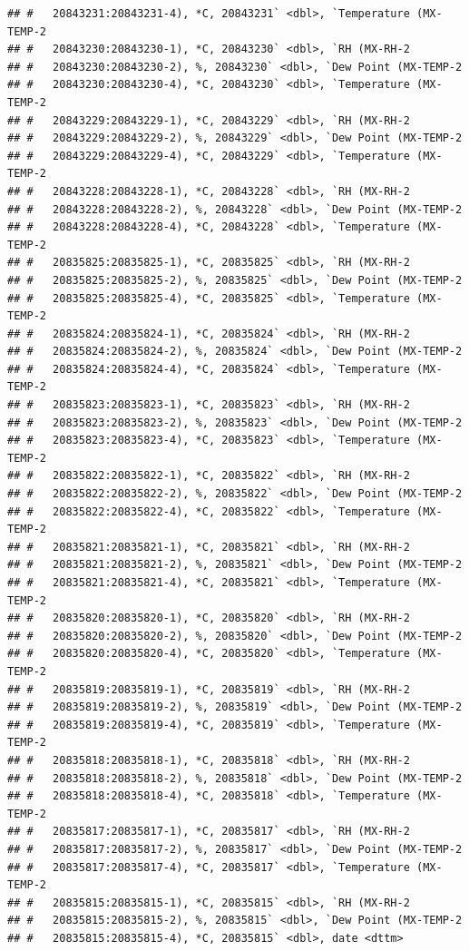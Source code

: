 \documentclass[]{article}
\begin{document}
\begin{verbatim}
## #   20843231:20843231-4), *C, 20843231` <dbl>, `Temperature (MX-TEMP-2
## #   20843230:20843230-1), *C, 20843230` <dbl>, `RH (MX-RH-2
## #   20843230:20843230-2), %, 20843230` <dbl>, `Dew Point (MX-TEMP-2
## #   20843230:20843230-4), *C, 20843230` <dbl>, `Temperature (MX-TEMP-2
## #   20843229:20843229-1), *C, 20843229` <dbl>, `RH (MX-RH-2
## #   20843229:20843229-2), %, 20843229` <dbl>, `Dew Point (MX-TEMP-2
## #   20843229:20843229-4), *C, 20843229` <dbl>, `Temperature (MX-TEMP-2
## #   20843228:20843228-1), *C, 20843228` <dbl>, `RH (MX-RH-2
## #   20843228:20843228-2), %, 20843228` <dbl>, `Dew Point (MX-TEMP-2
## #   20843228:20843228-4), *C, 20843228` <dbl>, `Temperature (MX-TEMP-2
## #   20835825:20835825-1), *C, 20835825` <dbl>, `RH (MX-RH-2
## #   20835825:20835825-2), %, 20835825` <dbl>, `Dew Point (MX-TEMP-2
## #   20835825:20835825-4), *C, 20835825` <dbl>, `Temperature (MX-TEMP-2
## #   20835824:20835824-1), *C, 20835824` <dbl>, `RH (MX-RH-2
## #   20835824:20835824-2), %, 20835824` <dbl>, `Dew Point (MX-TEMP-2
## #   20835824:20835824-4), *C, 20835824` <dbl>, `Temperature (MX-TEMP-2
## #   20835823:20835823-1), *C, 20835823` <dbl>, `RH (MX-RH-2
## #   20835823:20835823-2), %, 20835823` <dbl>, `Dew Point (MX-TEMP-2
## #   20835823:20835823-4), *C, 20835823` <dbl>, `Temperature (MX-TEMP-2
## #   20835822:20835822-1), *C, 20835822` <dbl>, `RH (MX-RH-2
## #   20835822:20835822-2), %, 20835822` <dbl>, `Dew Point (MX-TEMP-2
## #   20835822:20835822-4), *C, 20835822` <dbl>, `Temperature (MX-TEMP-2
## #   20835821:20835821-1), *C, 20835821` <dbl>, `RH (MX-RH-2
## #   20835821:20835821-2), %, 20835821` <dbl>, `Dew Point (MX-TEMP-2
## #   20835821:20835821-4), *C, 20835821` <dbl>, `Temperature (MX-TEMP-2
## #   20835820:20835820-1), *C, 20835820` <dbl>, `RH (MX-RH-2
## #   20835820:20835820-2), %, 20835820` <dbl>, `Dew Point (MX-TEMP-2
## #   20835820:20835820-4), *C, 20835820` <dbl>, `Temperature (MX-TEMP-2
## #   20835819:20835819-1), *C, 20835819` <dbl>, `RH (MX-RH-2
## #   20835819:20835819-2), %, 20835819` <dbl>, `Dew Point (MX-TEMP-2
## #   20835819:20835819-4), *C, 20835819` <dbl>, `Temperature (MX-TEMP-2
## #   20835818:20835818-1), *C, 20835818` <dbl>, `RH (MX-RH-2
## #   20835818:20835818-2), %, 20835818` <dbl>, `Dew Point (MX-TEMP-2
## #   20835818:20835818-4), *C, 20835818` <dbl>, `Temperature (MX-TEMP-2
## #   20835817:20835817-1), *C, 20835817` <dbl>, `RH (MX-RH-2
## #   20835817:20835817-2), %, 20835817` <dbl>, `Dew Point (MX-TEMP-2
## #   20835817:20835817-4), *C, 20835817` <dbl>, `Temperature (MX-TEMP-2
## #   20835815:20835815-1), *C, 20835815` <dbl>, `RH (MX-RH-2
## #   20835815:20835815-2), %, 20835815` <dbl>, `Dew Point (MX-TEMP-2
## #   20835815:20835815-4), *C, 20835815` <dbl>, date <dttm>
\end{verbatim}
\end{document}
